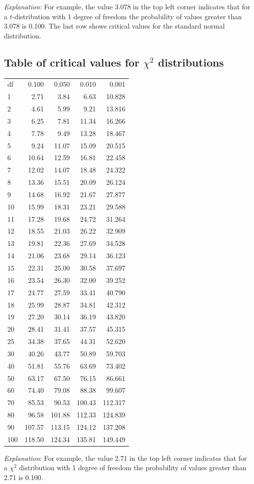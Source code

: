 \documentclass[11pt,a4paper,openany]{book}
\begin{document}
\emph{Explanation}: For example, the value 3.078 in the top left corner
indicates that for a \(t\)-distribution with 1 degree of freedom the
probability of values greater than 3.078 is 0.100. The last row shows
critical values for the standard normal distribution.

\newpage

\subsection{\texorpdfstring{Table of critical values for \(\chi^{2}\)
distributions}{Table of critical values for \textbackslash{}chi\^{}\{2\} distributions}}\label{s-disttables-chi2}

\begin{longtable}[]{@{}lrrrr@{}}
\toprule
df & 0.100 & 0.050 & 0.010 & 0.001\tabularnewline
1 & 2.71 & 3.84 & 6.63 & 10.828\tabularnewline
2 & 4.61 & 5.99 & 9.21 & 13.816\tabularnewline
3 & 6.25 & 7.81 & 11.34 & 16.266\tabularnewline
4 & 7.78 & 9.49 & 13.28 & 18.467\tabularnewline
5 & 9.24 & 11.07 & 15.09 & 20.515\tabularnewline
6 & 10.64 & 12.59 & 16.81 & 22.458\tabularnewline
7 & 12.02 & 14.07 & 18.48 & 24.322\tabularnewline
8 & 13.36 & 15.51 & 20.09 & 26.124\tabularnewline
9 & 14.68 & 16.92 & 21.67 & 27.877\tabularnewline
10 & 15.99 & 18.31 & 23.21 & 29.588\tabularnewline
11 & 17.28 & 19.68 & 24.72 & 31.264\tabularnewline
12 & 18.55 & 21.03 & 26.22 & 32.909\tabularnewline
13 & 19.81 & 22.36 & 27.69 & 34.528\tabularnewline
14 & 21.06 & 23.68 & 29.14 & 36.123\tabularnewline
15 & 22.31 & 25.00 & 30.58 & 37.697\tabularnewline
16 & 23.54 & 26.30 & 32.00 & 39.252\tabularnewline
17 & 24.77 & 27.59 & 33.41 & 40.790\tabularnewline
18 & 25.99 & 28.87 & 34.81 & 42.312\tabularnewline
19 & 27.20 & 30.14 & 36.19 & 43.820\tabularnewline
20 & 28.41 & 31.41 & 37.57 & 45.315\tabularnewline
25 & 34.38 & 37.65 & 44.31 & 52.620\tabularnewline
30 & 40.26 & 43.77 & 50.89 & 59.703\tabularnewline
40 & 51.81 & 55.76 & 63.69 & 73.402\tabularnewline
50 & 63.17 & 67.50 & 76.15 & 86.661\tabularnewline
60 & 74.40 & 79.08 & 88.38 & 99.607\tabularnewline
70 & 85.53 & 90.53 & 100.43 & 112.317\tabularnewline
80 & 96.58 & 101.88 & 112.33 & 124.839\tabularnewline
90 & 107.57 & 113.15 & 124.12 & 137.208\tabularnewline
100 & 118.50 & 124.34 & 135.81 & 149.449\tabularnewline
\bottomrule
\end{longtable}

\emph{Explanation}: For example, the value 2.71 in the top left corner
indicates that for a \(\chi^{2}\) distribution with 1 degree of freedom
the probability of values greater than 2.71 is 0.100.


\end{document}
